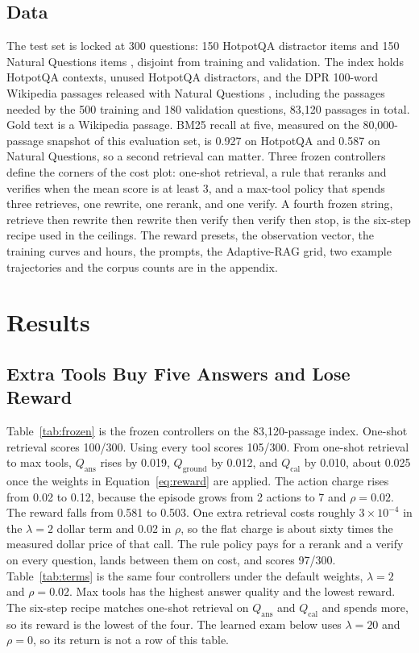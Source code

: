 \documentclass[letterpaper]{article} %
\begin{document}
\subsection{Data}
The test set is locked at 300 questions: 150 HotpotQA distractor items \cite{yang2018hotpotqa} and 150 Natural Questions items \cite{kwiatkowski2019nq}, disjoint from training and validation. The index holds HotpotQA contexts, unused HotpotQA distractors, and the DPR 100-word Wikipedia passages released with Natural Questions \cite{karpukhin2020dpr,gao2022tevatron}, including the passages needed by the 500 training and 180 validation questions, 83{,}120 passages in total. Gold text is a Wikipedia passage. BM25 recall at five, measured on the 80{,}000-passage snapshot of this evaluation set, is 0.927 on HotpotQA and 0.587 on Natural Questions, so a second retrieval can matter. Three frozen controllers define the corners of the cost plot: one-shot retrieval, a rule that reranks and verifies when the mean score is at least 3, and a max-tool policy that spends three retrieves, one rewrite, one rerank, and one verify. A fourth frozen string, retrieve then rewrite then rewrite then verify then verify then stop, is the six-step recipe used in the ceilings. The reward presets, the observation vector, the training curves and hours, the prompts, the Adaptive-RAG grid, two example trajectories and the corpus counts are in the appendix.

\section{Results}

\subsection{Extra Tools Buy Five Answers and Lose Reward}
Table~\ref{tab:frozen} is the frozen controllers on the 83{,}120-passage index. One-shot retrieval scores 100/300. Using every tool scores 105/300. From one-shot retrieval to max tools, \(Q_{\mathrm{ans}}\) rises by 0.019, \(Q_{\mathrm{ground}}\) by 0.012, and \(Q_{\mathrm{cal}}\) by 0.010, about 0.025 once the weights in Equation~\ref{eq:reward} are applied. The action charge rises from 0.02 to 0.12, because the episode grows from 2 actions to 7 and \(\rho{=}0.02\). The reward falls from 0.581 to 0.503. One extra retrieval costs roughly \(3\times 10^{-4}\) in the \(\lambda{=}2\) dollar term and 0.02 in \(\rho\), so the flat charge is about sixty times the measured dollar price of that call. The rule policy pays for a rerank and a verify on every question, lands between them on cost, and scores 97/300. Table~\ref{tab:terms} is the same four controllers under the default weights, \(\lambda{=}2\) and \(\rho{=}0.02\). Max tools has the highest answer quality and the lowest reward. The six-step recipe matches one-shot retrieval on \(Q_{\mathrm{ans}}\) and \(Q_{\mathrm{cal}}\) and spends more, so its reward is the lowest of the four. The learned exam below uses \(\lambda{=}20\) and \(\rho{=}0\), so its return is not a row of this table.
\end{document}

